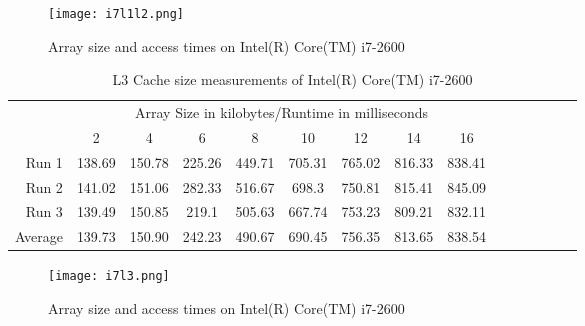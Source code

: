 \documentclass{article}
\begin{document}
\begin{comment}
78.18 &	78.33 &	75.27 &	88.51 &	85.65 &	97.22 &	138.36 & 139.49 & 138.69
77.75 &	78.61 &	76.95 &	88.71 &	85.23 &	98.08 &	138.65 & 139.87 & 141.02
78.14 &	78.21 &	79.22  & 88.84 & 85.7 &	96.84 &	140.93 & 139.74 & 139.49
78.02 &	78.38 & 77.15 &	88.69 &	85.53 &	97.38 &	139.31 &	139.7 &	139.73
\end{comment}

\begin{figure}[H]
\centering
\texttt{[image: i7l1l2.png]}
\caption{Array size and access times on Intel(R) Core(TM) i7-2600}
\label{pic:i7l1l2}
\end{figure}

\begin{table}[H]
\begin{tabular}{r|c|c|c|c|c|c|c|c|c|c|c|c|c|c|}

\multicolumn{1}{r}{}
 &  \multicolumn{8}{c}{Array Size in kilobytes/Runtime in milliseconds} \\
\cline{2-9}
  & 2 & 4 & 6 & 8 & 10 & 12 & 14 & 16 \\
\cline{2-9}
Run 1 & 138.69 &	150.78 &	225.26 &	449.71 &	705.31 &	765.02 &	816.33 &	838.41 \\
\cline{2-9}
Run 2 & 141.02 &	151.06 &	282.33 &	516.67 &	698.3 &	750.81 &	815.41 &	845.09 \\
\cline{2-9}
Run 3 & 139.49 &	150.85 &	219.1 &	505.63 &	667.74 &	753.23 &	809.21 &	832.11 \\
\cline{2-9}
Average & 139.73 &	150.90 &	242.23 &	490.67 &	690.45 &	756.35 &	813.65 &	838.54 \\
\cline{2-9}
\end{tabular}
 \caption{L3 Cache size measurements of Intel(R) Core(TM) i7-2600}
 \label{tab:i7L3}
\end{table}

\begin{comment}
138.69 &	150.78 &	225.26 &	449.71 &	705.31 &	765.02 &	816.33 &	838.41
141.02 &	151.06 &	282.33 &	516.67 &	698.3 &	750.81 &	815.41 &	845.09
139.49 &	150.85 &	219.1 &	505.63 &	667.74 &	753.23 &	809.21 &	832.11
139.73 &	150.90 &	242.23 &	490.67 &	690.45 &	756.35 &	813.65 &	838.54
\end{comment}


\begin{figure}[H]
\centering
\texttt{[image: i7l3.png]}
\caption{Array size and access times on Intel(R) Core(TM) i7-2600}
\label{pic:i7l3}
\end{figure}
\end{document}
